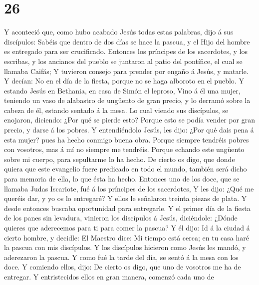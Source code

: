 \hypertarget{section-25}{%
\section{26}\label{section-25}}

 Y aconteció que, como hubo acabado Jesús todas estas
palabras, dijo á sus discípulos:  Sabéis que dentro de dos
días se hace la pascua, y el Hijo del hombre es entregado para ser
crucificado.  Entonces los príncipes de los sacerdotes, y
los escribas, y los ancianos del pueblo se juntaron al patio del
pontífice, el cual se llamaba Caifás;  Y tuvieron consejo
para prender por engaño á Jesús, y matarle.  Y decían: No en
el día de la fiesta, porque no se haga alboroto en el pueblo.
 Y estando Jesús en Bethania, en casa de Simón el leproso,
 Vino á él una mujer, teniendo un vaso de alabastro de
ungüento de gran precio, y lo derramó sobre la cabeza de él, estando
sentado á la mesa.  Lo cual viendo sus discípulos, se
enojaron, diciendo: ¿Por qué se pierde esto?  Porque esto se
podía vender por gran precio, y darse á los pobres.  Y
entendiéndolo Jesús, les dijo: ¿Por qué dais pena á esta mujer? pues ha
hecho conmigo buena obra.  Porque siempre tendréis pobres
con vosotros, mas á mí no siempre me tendréis.  Porque
echando este ungüento sobre mi cuerpo, para sepultarme lo ha hecho.
 De cierto os digo, que donde quiera que este evangelio
fuere predicado en todo el mundo, también será dicho para memoria de
ella, lo que ésta ha hecho.  Entonces uno de los doce, que
se llamaba Judas Iscariote, fué á los príncipes de los sacerdotes,
 Y les dijo: ¿Qué me queréis dar, y yo os lo entregaré? Y
ellos le señalaron treinta piezas de plata.  Y desde
entonces buscaba oportunidad para entregarle.  Y el primer
día de la fiesta de los panes sin levadura, vinieron los discípulos á
Jesús, diciéndole: ¿Dónde quieres que aderecemos para ti para comer la
pascua?  Y él dijo: Id á la ciudad á cierto hombre, y
decidle: El Maestro dice: Mi tiempo está cerca; en tu casa haré la
pascua con mis discípulos.  Y los discípulos hicieron como
Jesús les mandó, y aderezaron la pascua.  Y como fué la
tarde del día, se sentó á la mesa con los doce.  Y comiendo
ellos, dijo: De cierto os digo, que uno de vosotros me ha de entregar.
 Y entristecidos ellos en gran manera, comenzó cada uno de

